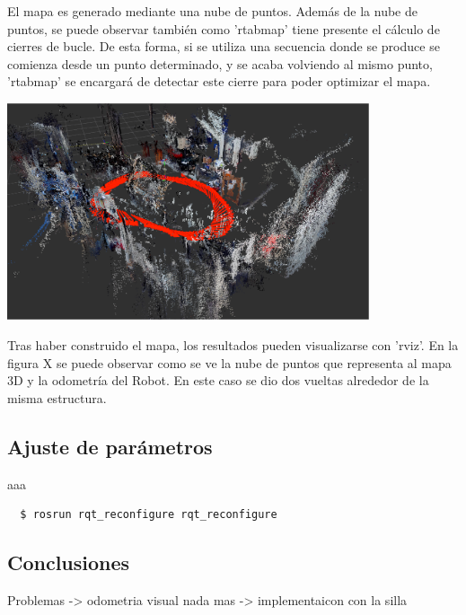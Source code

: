 El mapa es generado mediante una nube de puntos. Además de la nube de puntos, se
puede observar también como 'rtabmap' tiene presente el cálculo de cierres de
bucle. De esta forma, si se utiliza una secuencia donde se produce se comienza
desde un punto determinado, y se acaba volviendo al mismo punto, 'rtabmap' se
encargará de detectar este cierre para poder optimizar el mapa.

\begin{minipage}{\linewidth}
    \centering
    \includegraphics[width=0.8\textwidth]{images/cap4/rviz.eps}
    \label{fig:Ros-Diagram}
\end{minipage}

Tras haber construido el mapa, los resultados pueden visualizarse con 'rviz'. En
la figura X se puede observar como se ve la nube de puntos que representa al
mapa 3D y la odometría del Robot. En este caso se dio dos vueltas alrededor de
la misma estructura.

\subsection{Ajuste de parámetros}

aaa
\\
\begin{lstlisting}
  $ rosrun rqt_reconfigure rqt_reconfigure
\end{lstlisting}


\subsection{Conclusiones}

Problemas -> odometria visual nada mas -> implementaicon con la silla


